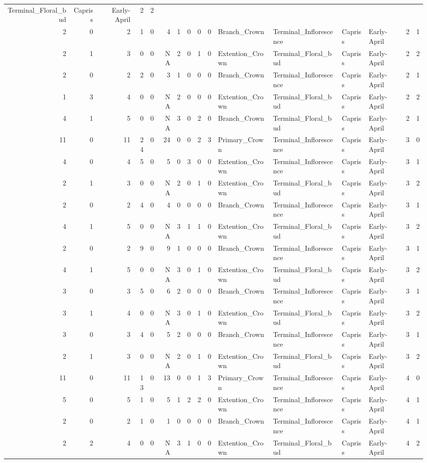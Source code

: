 \documentclass[]{article}
\begin{document}
\begin{longtable}[]{@{}rrrrrrrrrrllllrl@{}}
Terminal\_Floral\_bud & Capriss & Early-April & 2 & 2\tabularnewline
2 & 0 & 2 & 1 & 0 & 4 & 1 & 0 & 0 & 0 & Branch\_Crown &
Terminal\_Inflorescence & Capriss & Early-April & 2 & 1\tabularnewline
2 & 1 & 3 & 0 & 0 & NA & 2 & 0 & 1 & 0 & Extention\_Crown &
Terminal\_Floral\_bud & Capriss & Early-April & 2 & 2\tabularnewline
2 & 0 & 2 & 2 & 0 & 3 & 1 & 0 & 0 & 0 & Branch\_Crown &
Terminal\_Inflorescence & Capriss & Early-April & 2 & 1\tabularnewline
1 & 3 & 4 & 0 & 0 & NA & 2 & 0 & 0 & 0 & Extention\_Crown &
Terminal\_Floral\_bud & Capriss & Early-April & 2 & 2\tabularnewline
4 & 1 & 5 & 0 & 0 & NA & 3 & 0 & 2 & 0 & Branch\_Crown &
Terminal\_Floral\_bud & Capriss & Early-April & 2 & 1\tabularnewline
11 & 0 & 11 & 24 & 0 & 24 & 0 & 0 & 2 & 3 & Primary\_Crown &
Terminal\_Inflorescence & Capriss & Early-April & 3 & 0\tabularnewline
4 & 0 & 4 & 5 & 0 & 5 & 0 & 3 & 0 & 0 & Extention\_Crown &
Terminal\_Inflorescence & Capriss & Early-April & 3 & 1\tabularnewline
2 & 1 & 3 & 0 & 0 & NA & 2 & 0 & 1 & 0 & Extention\_Crown &
Terminal\_Floral\_bud & Capriss & Early-April & 3 & 2\tabularnewline
2 & 0 & 2 & 4 & 0 & 4 & 0 & 0 & 0 & 0 & Branch\_Crown &
Terminal\_Inflorescence & Capriss & Early-April & 3 & 1\tabularnewline
4 & 1 & 5 & 0 & 0 & NA & 3 & 1 & 1 & 0 & Extention\_Crown &
Terminal\_Floral\_bud & Capriss & Early-April & 3 & 2\tabularnewline
2 & 0 & 2 & 9 & 0 & 9 & 1 & 0 & 0 & 0 & Branch\_Crown &
Terminal\_Inflorescence & Capriss & Early-April & 3 & 1\tabularnewline
4 & 1 & 5 & 0 & 0 & NA & 3 & 0 & 1 & 0 & Extention\_Crown &
Terminal\_Floral\_bud & Capriss & Early-April & 3 & 2\tabularnewline
3 & 0 & 3 & 5 & 0 & 6 & 2 & 0 & 0 & 0 & Branch\_Crown &
Terminal\_Inflorescence & Capriss & Early-April & 3 & 1\tabularnewline
3 & 1 & 4 & 0 & 0 & NA & 3 & 0 & 1 & 0 & Extention\_Crown &
Terminal\_Floral\_bud & Capriss & Early-April & 3 & 2\tabularnewline
3 & 0 & 3 & 4 & 0 & 5 & 2 & 0 & 0 & 0 & Branch\_Crown &
Terminal\_Inflorescence & Capriss & Early-April & 3 & 1\tabularnewline
2 & 1 & 3 & 0 & 0 & NA & 2 & 0 & 1 & 0 & Extention\_Crown &
Terminal\_Floral\_bud & Capriss & Early-April & 3 & 2\tabularnewline
11 & 0 & 11 & 13 & 0 & 13 & 0 & 0 & 1 & 3 & Primary\_Crown &
Terminal\_Inflorescence & Capriss & Early-April & 4 & 0\tabularnewline
5 & 0 & 5 & 1 & 0 & 5 & 1 & 2 & 2 & 0 & Extention\_Crown &
Terminal\_Inflorescence & Capriss & Early-April & 4 & 1\tabularnewline
2 & 0 & 2 & 1 & 0 & 1 & 0 & 0 & 0 & 0 & Branch\_Crown &
Terminal\_Inflorescence & Capriss & Early-April & 4 & 1\tabularnewline
2 & 2 & 4 & 0 & 0 & NA & 3 & 1 & 0 & 0 & Extention\_Crown &
Terminal\_Floral\_bud & Capriss & Early-April & 4 & 2\tabularnewline

\end{longtable}
\end{document}

